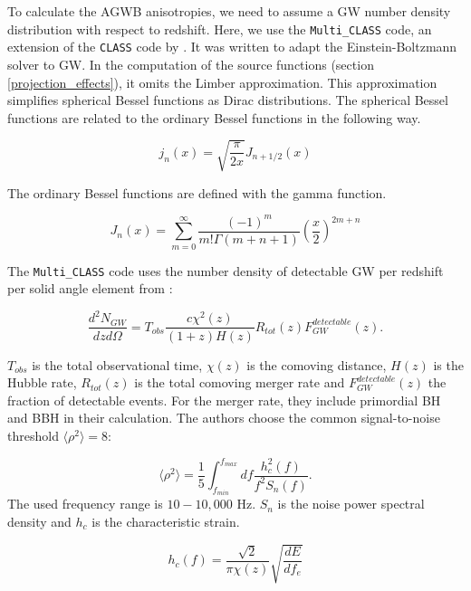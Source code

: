 To calculate the AGWB anisotropies, we need to assume a GW number density distribution with respect to redshift. Here, we use the {\tt Multi\_CLASS} code, an extension of the {\tt CLASS} code by \cite{bellomo_beware_2020}. It was written to adapt the Einstein-Boltzmann solver to GW. In the computation of the source functions (section \ref{projection_effects}), it omits the Limber approximation. This approximation simplifies spherical Bessel functions as Dirac distributions. The spherical Bessel functions are related to the ordinary Bessel functions in the following way.

\begin{equation}
    j_n(x)=\sqrt{\frac{\pi}{2x}}J_{n+1/2}(x)
\end{equation}

The ordinary Bessel functions are defined with the gamma function.

\begin{equation}
    J_n(x)=\sum_{m=0}^\infty \frac{(-1)^m}{m!\Gamma(m+n+1)}\left(\frac{x}{2}\right)^{2m+n}
\end{equation}

The {\tt Multi\_CLASS} code uses the number density of detectable GW per redshift per solid angle element from \cite{scelfo_gwtimeslss_2018}:

\begin{equation}
    \frac{d^2N_{GW}}{dzd\Omega} = T_{obs}\frac{c\chi^2(z)}{(1+z)H(z)}R_{tot}(z)F_{GW}^{detectable}(z).
\end{equation}

$T_{obs}$ is the total observational time, $\chi(z)$ is the comoving distance, $H(z)$ is the Hubble rate, $R_{tot}(z)$ is the total comoving merger rate and $F_{GW}^{detectable}(z)$ the fraction of detectable events. For the merger rate, they include primordial BH and BBH in their calculation. The authors choose the common signal-to-noise threshold $\langle \rho^2 \rangle =8$:

\begin{equation}
    \langle \rho^2 \rangle = \frac{1}{5}\int_{f_{min}}^{f_{max}} df \frac{h_c^2(f)}{f^2 S_n(f)}.
\end{equation}
The used frequency range is $10 - 10,000$ Hz. $S_n$ is the noise power spectral density and $h_c$ is the characteristic strain. 

\begin{equation}
    h_c(f)=\frac{\sqrt{2}}{\pi \chi(z)}\sqrt{\frac{dE}{df_e}}
\end{equation}

